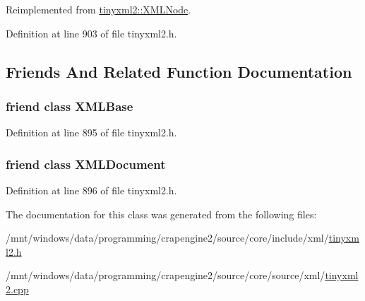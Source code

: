 Reimplemented from \hyperlink{classtinyxml2_1_1_x_m_l_node_a89009ffc1b9f5d692bf8d4c9f18c3bec}{tinyxml2\+::\+X\+M\+L\+Node}.



Definition at line 903 of file tinyxml2.\+h.



\subsection{Friends And Related Function Documentation}
\hypertarget{classtinyxml2_1_1_x_m_l_text_a449202cfc89e7ae5c2f81995476f9ec1}{}
\subsubsection[{X\+M\+L\+Base}]{\setlength{\rightskip}{0pt plus 5cm}friend class X\+M\+L\+Base\hspace{0.3cm}{\ttfamily [friend]}}\label{classtinyxml2_1_1_x_m_l_text_a449202cfc89e7ae5c2f81995476f9ec1}


Definition at line 895 of file tinyxml2.\+h.

\hypertarget{classtinyxml2_1_1_x_m_l_text_a4eee3bda60c60a30e4e8cd4ea91c4c6e}{}
\subsubsection[{X\+M\+L\+Document}]{\setlength{\rightskip}{0pt plus 5cm}friend class {\bf X\+M\+L\+Document}\hspace{0.3cm}{\ttfamily [friend]}}\label{classtinyxml2_1_1_x_m_l_text_a4eee3bda60c60a30e4e8cd4ea91c4c6e}


Definition at line 896 of file tinyxml2.\+h.



The documentation for this class was generated from the following files\+:\begin{DoxyCompactItemize}
\item 
/mnt/windows/data/programming/crapengine2/source/core/include/xml/\hyperlink{tinyxml2_8h}{tinyxml2.\+h}\item 
/mnt/windows/data/programming/crapengine2/source/core/source/xml/\hyperlink{tinyxml2_8cpp}{tinyxml2.\+cpp}\end{DoxyCompactItemize}
